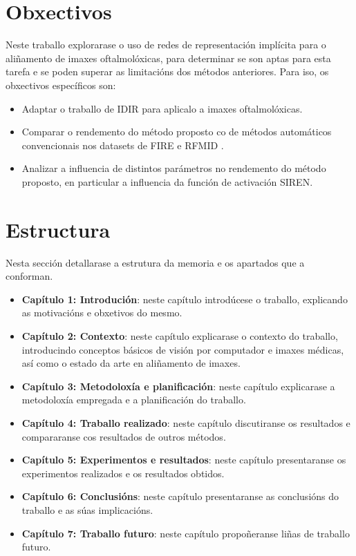 \section{Obxectivos}

Neste traballo explorarase o uso de redes de representación implícita para o aliñamento de imaxes oftalmolóxicas, para determinar se son aptas para esta tarefa e se poden superar as limitacións dos métodos anteriores.
Para iso, os obxectivos específicos son:
\begin{itemize}
    \item Adaptar o traballo de IDIR \cite{wolterink2021implicit} para aplicalo a imaxes oftalmolóxicas.
    \item Comparar o rendemento do método proposto co de métodos automáticos convencionais nos datasets de FIRE \cite{FIRE} e RFMID \cite{RFMiD}.
    \item Analizar a influencia de distintos parámetros no rendemento do método proposto, en particular a influencia da función de activación SIREN.
\end{itemize}

\section{Estructura }

Nesta sección detallarase a estrutura da memoria e os apartados que a conforman.

\begin{itemize}
    \item \textbf{Capítulo 1: Introdución}: neste capítulo introdúcese o traballo, explicando as motivacións e obxetivos do mesmo.
    \item \textbf{Capítulo 2: Contexto}: neste capítulo explicarase o contexto do traballo, introducindo conceptos básicos de visión por computador e imaxes médicas, así como o estado da arte en aliñamento de imaxes.
    \item \textbf{Capítulo 3: Metodoloxía e planificación}: neste capítulo explicarase a metodoloxía empregada e a planificación do traballo.
    \item \textbf{Capítulo 4: Traballo realizado}: neste capítulo discutiranse os resultados e compararanse cos resultados de outros métodos.
    \item \textbf{Capítulo 5: Experimentos e resultados}: neste capítulo presentaranse os experimentos realizados e os resultados obtidos. 
    \item \textbf{Capítulo 6: Conclusións}: neste capítulo presentaranse as conclusións do traballo e as súas implicacións.
    \item \textbf{Capítulo 7: Traballo futuro}: neste capítulo propoñeranse liñas de traballo futuro.
\end{itemize}
